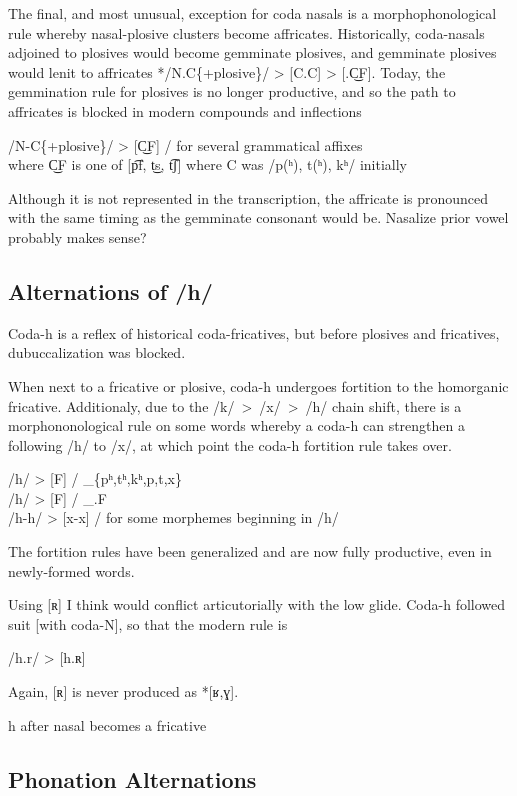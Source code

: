 \documentclass[12pt]{book} %
\begin{document}
The final, and most unusual, exception for coda nasals is a morphophonological rule whereby nasal-plosive clusters become affricates.
Historically, coda-nasals adjoined to plosives would become gemminate plosives, and gemminate plosives would lenit to affricates */N.C\{+plosive\}/ > [C.C] > [.C͜F].
Today, the gemmination rule for plosives is no longer productive, and so the path to affricates is blocked in modern compounds and inflections
\begin{center}
	/N-C\{+plosive\}/ > [C͜F] / for several grammatical affixes \\
	where C͜F is one of [p͡f, t͜s, t͡ʃ] where C was /p(ʰ), t(ʰ), kʰ/ initially
\end{center}
Although it is not represented in the transcription, the affricate is pronounced with the same timing as the gemminate consonant would be.
{\color{red}Nasalize prior vowel probably makes sense?}

\subsection{Alternations of /h/ }

Coda-h is a reflex of historical coda-fricatives, but before plosives and fricatives, dubuccalization was blocked.

When next to a fricative or plosive, coda-h undergoes fortition to the homorganic fricative.
Additionaly, due to the /k/~>~/x/~>~/h/ chain shift, there is a morphononological rule on some words whereby a coda-h can strengthen a following /h/ to /x/, at which point the coda-h fortition rule takes over.
\begin{center}
	/h/ > [F] / \_\{pʰ,tʰ,kʰ,p,t,x\} \\
	/h/ > [F] / \_.F \\
	/h-h/ > [x-x] / for some morphemes beginning in /h/
\end{center}
The fortition rules have been generalized and are now fully productive, even in newly-formed words.


{\color{red}
{\color{green} Using [ʀ] I think would conflict articutorially with the low glide.}
Coda-h followed suit [with coda-N], so that the modern rule is
\begin{center}
	/h.r/ > [h.ʀ]
\end{center}
Again, [ʀ] is never produced as *[ʁ,ɣ].
}

{\color{cyan}
h after nasal becomes a fricative
}

\subsection{Phonation Alternations}
\end{document}
